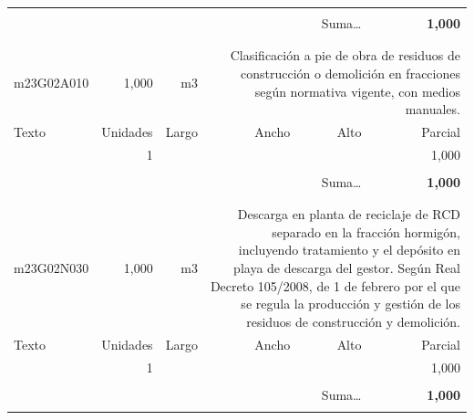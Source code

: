 \documentclass{book}%
\begin{document}
\begin{longtable}{lrrrrr}
&&&&&\\%
\multicolumn{5}{r}{Suma\ldots}&\textbf{     1,000}\\%
\hline%
&&&&&\\%
&&&&&\\%
m23G02A010&     1,000& m3&\multicolumn{3}{p{6cm}}{\scriptsize Clasificación a pie de obra de residuos de construcción o demolición en fracciones según normativa vigente, con medios manuales.\normalsize}\\%
Texto&Unidades&Largo&Ancho&Alto&Parcial\\%
\hline%
\multicolumn{1}{p{3.5cm}}{ }&1&&&&     1,000\\%
&&&&&\\%
\multicolumn{5}{r}{Suma\ldots}&\textbf{     1,000}\\%
\hline%
&&&&&\\%
&&&&&\\%
m23G02N030&     1,000& m3&\multicolumn{3}{p{6cm}}{\scriptsize Descarga en planta de reciclaje de RCD separado en la fracción hormigón, incluyendo tratamiento y el depósito en playa de descarga del gestor. Según Real Decreto 105/2008, de 1 de febrero por el que se regula la producción y gestión de los residuos de construcción y demolición.\normalsize}\\%
Texto&Unidades&Largo&Ancho&Alto&Parcial\\%
\hline%
\multicolumn{1}{p{3.5cm}}{ }&1&&&&     1,000\\%
&&&&&\\%
\multicolumn{5}{r}{Suma\ldots}&\textbf{     1,000}\\%
\hline%
&&&&&\\%
\end{longtable}%
\newpage

%
\end{document}
